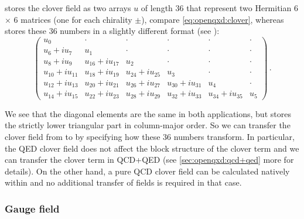 \Openqxd stores the clover field as two arrays $u$ of length $36$ that represent two Hermitian 6$\times$ 6 matrices (one for each chirality $\pm$), compare \cref{eq:openqxd:clover}, whereas \quda stores these 36 numbers in a slightly different format (see  \cite{QUDApaper}):
\begin{equation}
\begin{pmatrix}
u_0              & \cdot            & \cdot            & \cdot            & \cdot            & \cdot \\
u_6 + iu_7       & u_1              & \cdot            & \cdot            & \cdot            & \cdot \\
u_8 + iu_9       & u_{16} + iu_{17} & u_2              & \cdot            & \cdot            & \cdot \\
u_{10} + iu_{11} & u_{18} + iu_{19} & u_{24} + iu_{25} & u_3              & \cdot            & \cdot \\
u_{12} + iu_{13} & u_{20} + iu_{21} & u_{26} + iu_{27} & u_{30} + iu_{31} & u_4              & \cdot \\
u_{14} + iu_{15} & u_{22} + iu_{23} & u_{28} + iu_{29} & u_{32} + iu_{33} & u_{34} + iu_{35} & u_5
\end{pmatrix}\,.
\end{equation}

We see that the diagonal elements are the same in both applications, but \quda stores the strictly lower triangular part in column-major order.
So we can transfer the clover field from \openqxd to \quda by specifying how these 36 numbers transform. In particular, the QED
clover field does not affect the block structure of the clover term and we can transfer the clover term in QCD+QED (see \cref{sec:openqxd:qcd+qed} more for details).
On the other hand, a pure QCD clover field can be calculated natively within \quda and no additional transfer of fields is required in that case.

\subsubsection{Gauge field}

